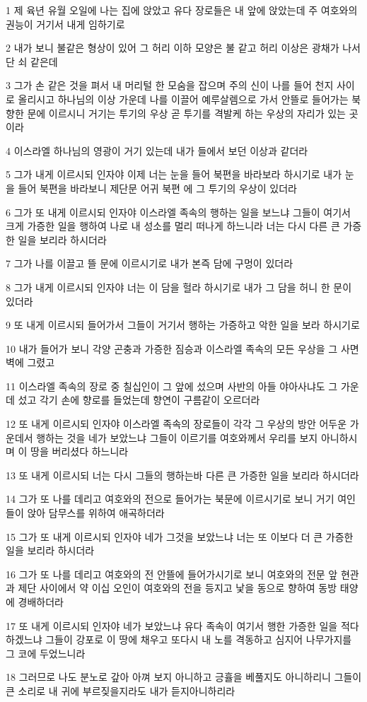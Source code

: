 \par 1 제 육년 유월 오일에 나는 집에 앉았고 유다 장로들은 내 앞에 앉았는데 주 여호와의 권능이 거기서 내게 임하기로
\par 2 내가 보니 불같은 형상이 있어 그 허리 이하 모양은 불 같고 허리 이상은 광채가 나서 단 쇠 같은데
\par 3 그가 손 같은 것을 펴서 내 머리털 한 모숨을 잡으며 주의 신이 나를 들어 천지 사이로 올리시고 하나님의 이상 가운데 나를 이끌어 예루살렘으로 가서 안뜰로 들어가는 북향한 문에 이르시니 거기는 투기의 우상 곧 투기를 격발케 하는 우상의 자리가 있는 곳이라
\par 4 이스라엘 하나님의 영광이 거기 있는데 내가 들에서 보던 이상과 같더라
\par 5 그가 내게 이르시되 인자야 이제 너는 눈을 들어 북편을 바라보라 하시기로 내가 눈을 들어 북편을 바라보니 제단문 어귀 북편 에 그 투기의 우상이 있더라
\par 6 그가 또 내게 이르시되 인자야 이스라엘 족속의 행하는 일을 보느냐 그들이 여기서 크게 가증한 일을 행하여 나로 내 성소를 멀리 떠나게 하느니라 너는 다시 다른 큰 가증한 일을 보리라 하시더라
\par 7 그가 나를 이끌고 뜰 문에 이르시기로 내가 본즉 담에 구멍이 있더라
\par 8 그가 내게 이르시되 인자야 너는 이 담을 헐라 하시기로 내가 그 담을 허니 한 문이 있더라
\par 9 또 내게 이르시되 들어가서 그들이 거기서 행하는 가증하고 악한 일을 보라 하시기로
\par 10 내가 들어가 보니 각양 곤충과 가증한 짐승과 이스라엘 족속의 모든 우상을 그 사면 벽에 그렸고
\par 11 이스라엘 족속의 장로 중 칠십인이 그 앞에 섰으며 사반의 아들 야아사냐도 그 가운데 섰고 각기 손에 향로를 들었는데 향연이 구름같이 오르더라
\par 12 또 내게 이르시되 인자야 이스라엘 족속의 장로들이 각각 그 우상의 방안 어두운 가운데서 행하는 것을 네가 보았느냐 그들이 이르기를 여호와께서 우리를 보지 아니하시며 이 땅을 버리셨다 하느니라
\par 13 또 내게 이르시되 너는 다시 그들의 행하는바 다른 큰 가증한 일을 보리라 하시더라
\par 14 그가 또 나를 데리고 여호와의 전으로 들어가는 북문에 이르시기로 보니 거기 여인들이 앉아 담무스를 위하여 애곡하더라
\par 15 그가 또 내게 이르시되 인자야 네가 그것을 보았느냐 너는 또 이보다 더 큰 가증한 일을 보리라 하시더라
\par 16 그가 또 나를 데리고 여호와의 전 안뜰에 들어가시기로 보니 여호와의 전문 앞 현관과 제단 사이에서 약 이십 오인이 여호와의 전을 등지고 낯을 동으로 향하여 동방 태양에 경배하더라
\par 17 또 내게 이르시되 인자야 네가 보았느냐 유다 족속이 여기서 행한 가증한 일을 적다 하겠느냐 그들이 강포로 이 땅에 채우고 또다시 내 노를 격동하고 심지어 나무가지를 그 코에 두었느니라
\par 18 그러므로 나도 분노로 갚아 아껴 보지 아니하고 긍휼을 베풀지도 아니하리니 그들이 큰 소리로 내 귀에 부르짖을지라도 내가 듣지아니하리라

